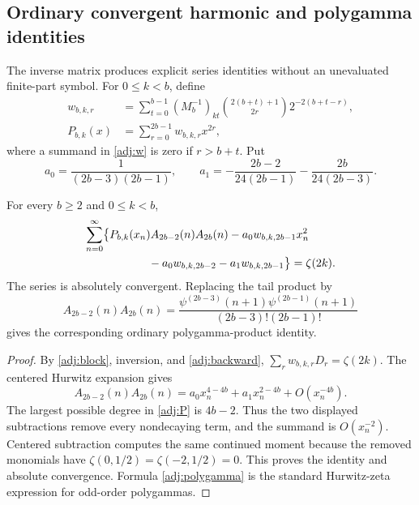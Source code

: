 \subsection{Ordinary convergent harmonic and polygamma identities}

The inverse matrix produces explicit series identities without an
unevaluated finite-part symbol.  For $0\le k<b$, define
\begin{align}
 w_{b,k,r}
 &=\sum_{t=0}^{b-1}(M_b^{-1})_{kt}
 \binom{2(b+t)+1}{2r}2^{-2(b+t-r)},
 \label{adj:w}\\
 P_{b,k}(x)&=\sum_{r=0}^{2b-1}w_{b,k,r}x^{2r},
 \label{adj:P}
\end{align}
where a summand in \eqref{adj:w} is zero if $r>b+t$.  Put
\begin{equation}\label{adj:alpha}
 a_0=\frac1{(2b-3)(2b-1)},\qquad
 a_1=-\frac{2b-2}{24(2b-1)}-\frac{2b}{24(2b-3)}.
\end{equation}

\begin{corollary}
\label{adj:ordinary}
For every $b\ge2$ and $0\le k<b$,
\begin{equation}\label{adj:ordinary-family}
 \begin{split}
 \sum_{n=0}^{\infty}\bigl\{&P_{b,k}(x_n)A_{2b-2}(n)A_{2b}(n)
       -a_0w_{b,k,2b-1}x_n^2\\
 &\hspace{12mm}-a_0w_{b,k,2b-2}-a_1w_{b,k,2b-1}\bigr\}
 =\zeta(2k).
 \end{split}
\end{equation}
The series is absolutely convergent.  Replacing the tail product by
\begin{equation}\label{adj:polygamma}
 A_{2b-2}(n)A_{2b}(n)
 =\frac{\psi^{(2b-3)}(n+1)\psi^{(2b-1)}(n+1)}
 {(2b-3)!(2b-1)!}
\end{equation}
gives the corresponding ordinary polygamma-product identity.
\end{corollary}

\begin{proof}
By \eqref{adj:block}, inversion, and \eqref{adj:backward},
$\sum_rw_{b,k,r}D_r=\zeta(2k)$.  The centered Hurwitz
expansion gives
\[
 A_{2b-2}(n)A_{2b}(n)
 =a_0x_n^{4-4b}+a_1x_n^{2-4b}+O(x_n^{-4b}).
\]
The largest possible degree in \eqref{adj:P} is $4b-2$.
Thus the two displayed subtractions remove every nondecaying term,
and the summand is $O(x_n^{-2})$.  Centered subtraction computes
the same continued moment because the removed monomials have
$\zeta(0,1/2)=\zeta(-2,1/2)=0$.  This proves the identity and
absolute convergence.  Formula \eqref{adj:polygamma} is the
standard Hurwitz-zeta expression for odd-order polygammas.
\end{proof}

